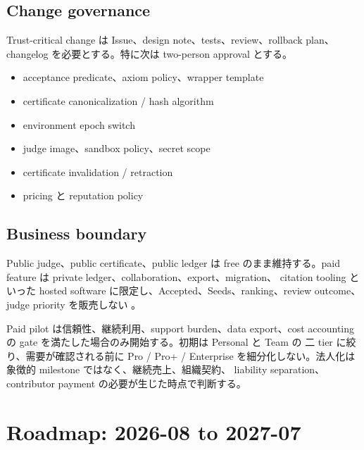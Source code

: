 \documentclass[a4paper,11pt]{ltjsarticle}
\begin{document}
\subsection{Change governance}

Trust-critical change は Issue、design note、tests、review、rollback plan、changelog を必要とする。特に次は two-person approval とする。

\begin{itemize}
  \item acceptance predicate、axiom policy、wrapper template
  \item certificate canonicalization / hash algorithm
  \item environment epoch switch
  \item judge image、sandbox policy、secret scope
  \item certificate invalidation / retraction
  \item pricing と reputation policy
\end{itemize}

\subsection{Business boundary}

Public judge、public certificate、public ledger は free のまま維持する。paid feature は private ledger、collaboration、export、migration、
citation tooling といった hosted software に限定し、Accepted、Seeds、ranking、review outcome、judge priority を販売しない
\cite{tfpricing}。

Paid pilot は信頼性、継続利用、support burden、data export、cost accounting の gate を満たした場合のみ開始する。初期は Personal と Team の
二 tier に絞り、需要が確認される前に Pro / Pro+ / Enterprise を細分化しない。法人化は象徴的 milestone ではなく、継続売上、組織契約、
liability separation、contributor payment の必要が生じた時点で判断する。

\section{Roadmap: 2026-08 to 2027-07}
\end{document}
